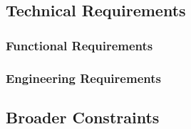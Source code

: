 \subsection{Technical Requirements}
\subsubsection{Functional Requirements}
\subsubsection{Engineering Requirements}

\subsection{Broader Constraints}
